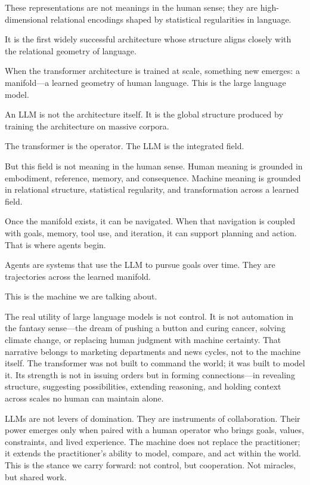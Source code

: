 \documentclass[
]{article}
\begin{document}
These representations are not meanings in the human sense; they are
high-dimensional relational encodings shaped by statistical regularities
in language.

It is the first widely successful architecture whose structure aligns
closely with the relational geometry of language.

When the transformer architecture is trained at scale, something new
emerges: a manifold---a learned geometry of human language. This is the
large language model.

An LLM is not the architecture itself. It is the global structure
produced by training the architecture on massive corpora.

The transformer is the operator. The LLM is the integrated field.

But this field is not meaning in the human sense. Human meaning is
grounded in embodiment, reference, memory, and consequence. Machine
meaning is grounded in relational structure, statistical regularity, and
transformation across a learned field.

Once the manifold exists, it can be navigated. When that navigation is
coupled with goals, memory, tool use, and iteration, it can support
planning and action. That is where agents begin.

Agents are systems that use the LLM to pursue goals over time. They are
trajectories across the learned manifold.

This is the machine we are talking about.

The real utility of large language models is not control. It is not
automation in the fantasy sense---the dream of pushing a button and
curing cancer, solving climate change, or replacing human judgment with
machine certainty. That narrative belongs to marketing departments and
news cycles, not to the machine itself. The transformer was not built to
command the world; it was built to model it. Its strength is not in
issuing orders but in forming connections---in revealing structure,
suggesting possibilities, extending reasoning, and holding context
across scales no human can maintain alone.

LLMs are not levers of domination. They are instruments of
collaboration. Their power emerges only when paired with a human
operator who brings goals, values, constraints, and lived experience.
The machine does not replace the practitioner; it extends the
practitioner's ability to model, compare, and act within the world. This
is the stance we carry forward: not control, but cooperation. Not
miracles, but shared work.
\end{document}
